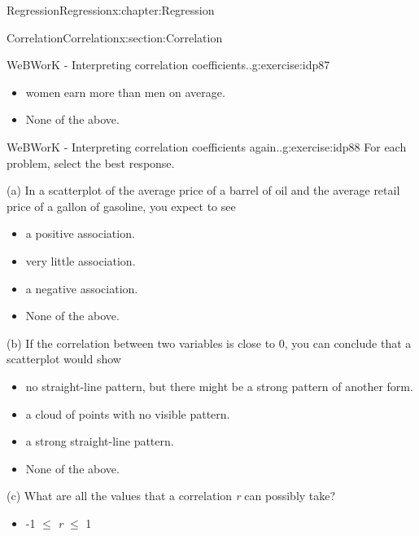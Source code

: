 \documentclass[oneside,10pt,]{book}
\numberwithin{equation}{section}
\begin{document}
\begin{chapterptx}{Regression}{}{Regression}{}{}{x:chapter:Regression}
\begin{sectionptx}{Correlation}{}{Correlation}{}{}{x:section:Correlation}
\begin{inlineexercise}{WeBWorK - Interpreting correlation coefficients..}{g:exercise:idp87}
\begin{itemize}[label=$\odot$,leftmargin=3em,]
\item{}women earn more than men on average.%

\item{}None of the above.%

\end{itemize}
%
\end{inlineexercise}%
\begin{inlineexercise}{WeBWorK - Interpreting correlation coefficients again..}{g:exercise:idp88}%
For each problem, select the best response.%
\par
(a)   In a scatterplot of the average price of a barrel of oil and the average retail price of a gallon of gasoline, you expect to see%
\par
\begin{itemize}[label=$\odot$,leftmargin=3em,]
\item{}a positive association.%

\item{}very little association.%

\item{}a negative association.%

\item{}None of the above.%

\end{itemize}
%
\par
(b)   If the correlation between two variables is close to 0, you can conclude that a scatterplot would show%
\par
\begin{itemize}[label=$\odot$,leftmargin=3em,]
\item{}no straight-line pattern, but there might be a strong pattern of another form.%

\item{}a cloud of points with no visible pattern.%

\item{}a strong straight-line pattern.%

\item{}None of the above.%

\end{itemize}
%
\par
(c)   What are all the values that a correlation \emph{r} can possibly take?%
\par
\begin{itemize}[label=$\odot$,leftmargin=3em,]
\item{}-1  \(\le\) \emph{r} \(\le\) 1%


\end{itemize}
\end{inlineexercise}
\end{sectionptx}
\end{chapterptx}
\end{document}
